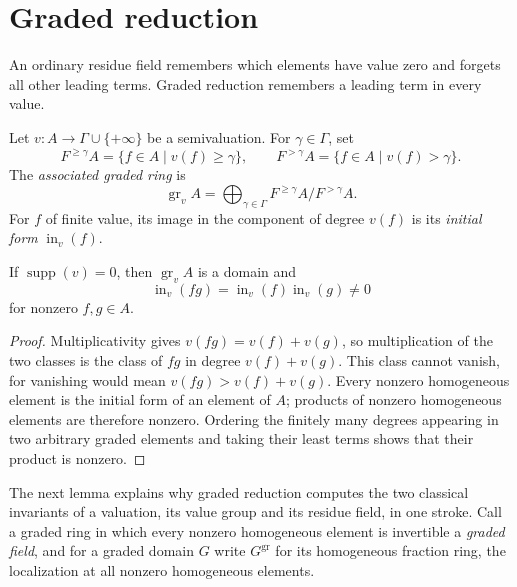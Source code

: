 \section{Graded reduction}

An ordinary residue field remembers which elements have value zero and
forgets all other leading terms. Graded reduction remembers a leading term
in every value.

\begin{definition}\label{def:valuation-associated-graded}
Let $v:A\to\Gamma\cup\{+\infty\}$ be a semivaluation. For
$\gamma\in\Gamma$, set
\[
 F^{\geq\gamma}A=\{f\in A\mid v(f)\geq\gamma\},\qquad
 F^{>\gamma}A=\{f\in A\mid v(f)>\gamma\}.
\]
The \emph{associated graded ring} is
\[
             \operatorname{gr}_v A=
       \bigoplus_{\gamma\in\Gamma}
       F^{\geq\gamma}A/F^{>\gamma}A.
\]
For $f$ of finite value, its image in the component of degree $v(f)$ is its
\emph{initial form} $\operatorname{in}_v(f)$.
\end{definition}

\begin{proposition}
\label{prop:graded-domain}
If $\operatorname{supp}(v)=0$, then $\operatorname{gr}_v A$ is a domain and
\[
       \operatorname{in}_v(fg)
       =\operatorname{in}_v(f)\operatorname{in}_v(g)\ne0
\]
for nonzero $f,g\in A$.
\end{proposition}
\begin{proof}
Multiplicativity gives $v(fg)=v(f)+v(g)$, so multiplication of the two
classes is the class of $fg$ in degree $v(f)+v(g)$. This class cannot vanish,
for vanishing would mean $v(fg)>v(f)+v(g)$. Every nonzero homogeneous element
is the initial form of an element of $A$; products of nonzero homogeneous
elements are therefore nonzero. Ordering the finitely many degrees appearing
in two arbitrary graded elements and taking their least terms shows that
their product is nonzero.
\end{proof}

The next lemma explains why graded reduction computes the two classical
invariants of a valuation, its value group and its residue field, in one
stroke. Call a graded ring in which every nonzero homogeneous element is
invertible a \emph{graded field}, and for a graded domain $G$ write
$G^{\mathrm{gr}}$ for its homogeneous fraction ring, the localization at
all nonzero homogeneous elements.

